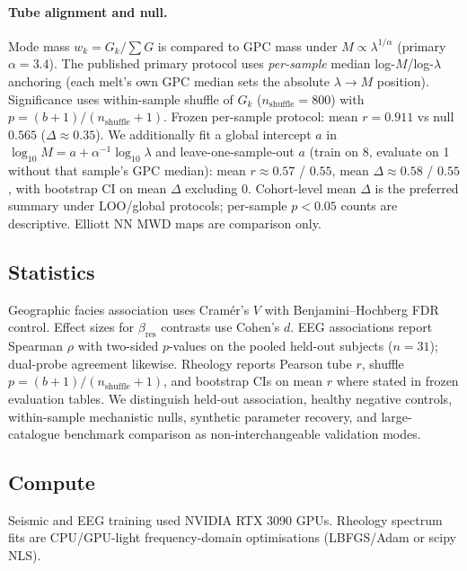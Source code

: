 \documentclass[twocolumn, 10pt]{article}
\begin{document}
\paragraph{Tube alignment and null.}
Mode mass \(w_k=G_k/\sum G\) is compared to GPC mass under \(M\propto\lambda^{1/\alpha}\) (primary \(\alpha=3.4\)\cite{doi1986}). The published primary protocol uses \emph{per-sample} median log-\(M\)/log-\(\lambda\) anchoring (each melt's own GPC median sets the absolute \(\lambda\!\to\!M\) position). Significance uses within-sample shuffle of \(G_k\) (\(n_{\mathrm{shuffle}}=800\)) with \(p=(b+1)/(n_{\mathrm{shuffle}}+1)\). Frozen per-sample protocol: mean \(r=0.911\) vs null \(0.565\) (\(\Delta\approx0.35\)). We additionally fit a global intercept \(a\) in \(\log_{10}M=a+\alpha^{-1}\log_{10}\lambda\) and leave-one-sample-out \(a\) (train on 8, evaluate on 1 without that sample's GPC median): mean \(r\approx0.57\) / \(0.55\), mean \(\Delta\approx0.58\) / \(0.55\), with bootstrap CI on mean \(\Delta\) excluding 0. Cohort-level mean \(\Delta\) is the preferred summary under LOO/global protocols; per-sample \(p<0.05\) counts are descriptive. Elliott NN MWD maps are comparison only\cite{elliott2025}.

\subsection*{Statistics}

Geographic facies association uses Cram\'er's \(V\) with Benjamini--Hochberg FDR control. Effect sizes for \(\beta_{\mathrm{res}}\) contrasts use Cohen's \(d\). EEG associations report Spearman \(\rho\) with two-sided \(p\)-values on the pooled held-out subjects (\(n=31\)); dual-probe agreement likewise. Rheology reports Pearson tube \(r\), shuffle \(p=(b+1)/(n_{\mathrm{shuffle}}+1)\), and bootstrap CIs on mean \(r\) where stated in frozen evaluation tables. We distinguish held-out association, healthy negative controls, within-sample mechanistic nulls, synthetic parameter recovery, and large-catalogue benchmark comparison as non-interchangeable validation modes.

\subsection*{Compute}

Seismic and EEG training used NVIDIA RTX 3090 GPUs. Rheology spectrum fits are CPU/GPU-light frequency-domain optimisations (LBFGS/Adam or scipy NLS).
\end{document}
